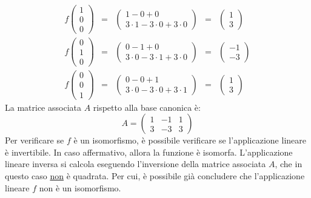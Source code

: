 \documentclass[a4paper]{article}
\begin{document}
	\begin{equation*}
		\begin{array}{lllll}
			f\begin{pmatrix}
				1 \\ 0 \\ 0
			\end{pmatrix} &=&
			\begin{pmatrix}
				1 - 0 + 0 \\
				3 \cdot 1 - 3 \cdot 0 + 3 \cdot 0
			\end{pmatrix} &=&
			\begin{pmatrix}
				1 \\ 3
			\end{pmatrix} \\ [1.8em]
			
			f\begin{pmatrix}
				0 \\ 1 \\ 0
			\end{pmatrix} &=&
			\begin{pmatrix}
				0 - 1 + 0 \\
				3 \cdot 0 - 3 \cdot 1 + 3 \cdot 0
			\end{pmatrix} &=&
			\begin{pmatrix}
				-1 \\ -3
			\end{pmatrix} \\ [1.8em]
			
			f\begin{pmatrix}
				0 \\ 0 \\ 1
			\end{pmatrix} &=&
			\begin{pmatrix}
				0 - 0 + 1 \\
				3 \cdot 0 - 3 \cdot 0 + 3 \cdot 1
			\end{pmatrix} &=&
			\begin{pmatrix}
				1 \\ 3
			\end{pmatrix}
		\end{array}
	\end{equation*}
	La matrice associata $A$ rispetto alla base canonica è:
	\begin{equation*}
		A = \begin{pmatrix}
			1 & -1 & 1 \\
			3 & -3 & 3
		\end{pmatrix}
	\end{equation*}
	Per verificare se $f$ è un isomorfismo, è possibile verificare se l'applicazione lineare è invertibile. In caso affermativo, allora la funzione è isomorfa. L'applicazione lineare inversa si calcola eseguendo l'inversione della matrice associata $A$, che in questo caso \underline{non} è quadrata. Per cui, è possibile già concludere che l'applicazione lineare $f$ non è un isomorfismo.\newpage
	
\end{document}
